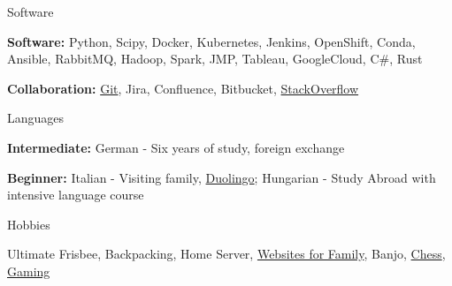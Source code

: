

\begin{cventries}

  \cventry
    {Software} %
    {} %
    {} %
    {} %
    {
      \begin{cvitems} %
        \item {\textbf{Software:} Python, Scipy, Docker, Kubernetes, Jenkins, OpenShift, Conda, Ansible, RabbitMQ, Hadoop, Spark, JMP, Tableau, GoogleCloud, C\#, Rust}
        \item {\textbf{Collaboration:} \href{https://github.com/severalfew}{Git}, Jira, Confluence, Bitbucket, \href{https://stackoverflow.com/users/5037133/snygard}{StackOverflow}}
      \end{cvitems}
    }
  \cventry
    {Languages} %
    {} %
    {} %
    {} %
    {
      \begin{cvitems} %
        \item {\textbf{Intermediate:} German - Six years of study, foreign exchange}
        \item {\textbf{Beginner:} Italian - Visiting family, \href{https://www.duolingo.com/profile/grey_ranger}{Duolingo}; Hungarian - Study Abroad with intensive language course}
      \end{cvitems}
    }
  \cventry
    {Hobbies} %
    {} %
    {} %
    {} %
    {
      \begin{cvitems} %
        \item {Ultimate Frisbee, Backpacking, Home Server, \href{https://mallorynygard.com}{Websites for Family}, Banjo, \href{https://www.chess.com/member/grey_ranger}{Chess}, \href{https://steamcommunity.com/id/grey_ranger/}{Gaming}}
      \end{cvitems}
    }
\end{cventries}
